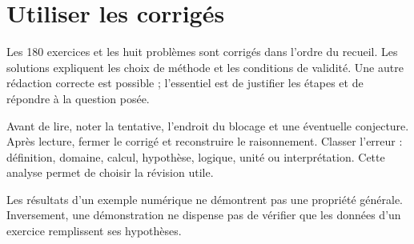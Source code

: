 
\chapter*{Utiliser les corrigés}
Les 180 exercices et les huit problèmes sont corrigés dans l'ordre du recueil.
Les solutions expliquent les choix de méthode et les conditions de validité.
Une autre rédaction correcte est possible ; l'essentiel est de justifier les
étapes et de répondre à la question posée.

Avant de lire, noter la tentative, l'endroit du blocage et une éventuelle
conjecture. Après lecture, fermer le corrigé et reconstruire le raisonnement.
Classer l'erreur : définition, domaine, calcul, hypothèse, logique, unité ou
interprétation. Cette analyse permet de choisir la révision utile.

Les résultats d'un exemple numérique ne démontrent pas une propriété générale.
Inversement, une démonstration ne dispense pas de vérifier que les données
d'un exercice remplissent ses hypothèses.
